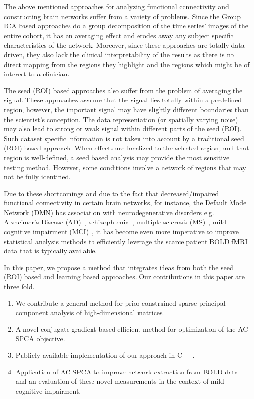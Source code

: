 \documentclass{llncs}
\begin{document}
The above mentioned approaches for analyzing functional connectivity and constructing brain networks suffer from a variety of problems. Since the Group ICA based approaches do a group decomposition of the time series' images of the entire cohort, it has an averaging effect and erodes away any subject specific characteristics of the network. Moreover, since these approaches are totally data driven, they also lack the clinical interpretability of the results as there is no direct mapping from the regions they highlight and the regions which might be of interest to a clinician. 

The seed (ROI) based approaches also suffer from the problem of averaging the signal. These approaches assume that the signal lies totally within a predefined region, however, the important signal may have slightly different boundaries than the scientist's conception.  The data representation (or spatially varying noise) may
also lead to strong or weak signal within different parts of the seed (ROI).
Such dataset specific information is not taken into account by a
traditional seed (ROI) based approach.  When effects are localized to the selected region, and that region is well-defined, a seed based analysis may
provide the most sensitive testing method.  However, some conditions
involve a network of regions that may not be fully identified.

Due to these shortcomings and due to the fact that decreased/impaired functional connectivity in certain brain networks, for instance, the Default Mode Network (DMN) has association with neurodegenerative disorders e.g. Alzheimer's Disease (AD)~\cite{greicius2004default}, schizophrenia~\cite{liu2008disrupted,whitfield2009hyperactivity}, multiple sclerosis (MS)~\cite{lowe2008resting}, mild cognitive impairment (MCI)~\cite{petrella2011default}, it has become even more imperative to improve statistical analysis methods to efficiently leverage the scarce patient BOLD fMRI data that is typically available. 

In this paper, we propose a method that integrates ideas from both the seed (ROI) based and learning based approaches. Our contributions in this paper are three fold.

\begin{enumerate}
\item We contribute a general method for prior-constrained sparse principal component analysis of high-dimensional matrices.
\item A novel conjugate gradient based efficient method for optimization of the AC-SPCA objective. 
\item Publicly available implementation of our approach in C++.
\item Application of AC-SPCA to improve network extraction from BOLD data and an evaluation of these novel measurements in the context of mild cognitive impairment.  
\end{enumerate}
\end{document}
